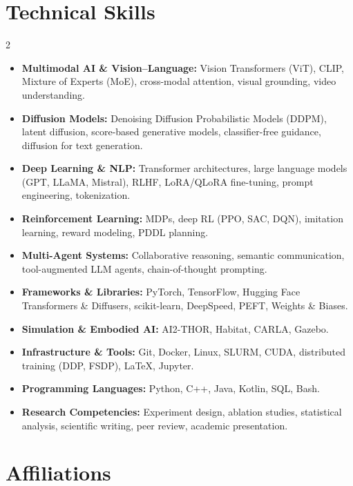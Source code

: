 \documentclass[a4paper,11pt]{article}
\begin{document}
\section*{Technical Skills}

\begin{multicols}{2}
  \small
  \begin{itemize}[leftmargin=*,itemsep=2pt]
    \item \textbf{Multimodal AI \& Vision--Language:} Vision Transformers (ViT), CLIP, Mixture of Experts (MoE), cross-modal attention, visual grounding, video understanding.
    \item \textbf{Diffusion Models:} Denoising Diffusion Probabilistic Models (DDPM), latent diffusion, score-based generative models, classifier-free guidance, diffusion for text generation.
    \item \textbf{Deep Learning \& NLP:} Transformer architectures, large language models (GPT, LLaMA, Mistral), RLHF, LoRA/QLoRA fine-tuning, prompt engineering, tokenization.
    \item \textbf{Reinforcement Learning:} MDPs, deep RL (PPO, SAC, DQN), imitation learning, reward modeling, PDDL planning.
    \item \textbf{Multi-Agent Systems:} Collaborative reasoning, semantic communication, tool-augmented LLM agents, chain-of-thought prompting.
    \item \textbf{Frameworks \& Libraries:} PyTorch, TensorFlow, Hugging Face Transformers \& Diffusers, scikit-learn, DeepSpeed, PEFT, Weights \& Biases.
    \item \textbf{Simulation \& Embodied AI:} AI2-THOR, Habitat, CARLA, Gazebo.
    \item \textbf{Infrastructure \& Tools:} Git, Docker, Linux, SLURM, CUDA, distributed training (DDP, FSDP), LaTeX, Jupyter.
    \item \textbf{Programming Languages:} Python, C++, Java, Kotlin, SQL, Bash.
    \item \textbf{Research Competencies:} Experiment design, ablation studies, statistical analysis, scientific writing, peer review, academic presentation.
  \end{itemize}
\end{multicols}

\section*{Affiliations}
\end{document}
